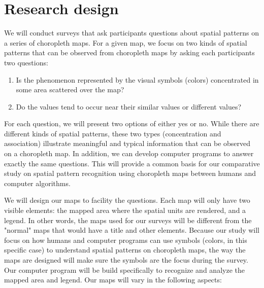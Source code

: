 \section{Research design}


We will conduct surveys that ask participants questions about spatial patterns on a series of choropleth maps. For a given map, we focus on two kinds of spatial patterns that can be observed from choropleth maps by asking each participants two questions:

\begin{enumerate}
    \item Is the phenomenon represented by the visual symbols (colors) concentrated in some area scattered over the map? 
    \item Do the values tend to occur near their similar values or different values? 
\end{enumerate}

For each question, we will present two options of either yes or no. While there are different kinds of spatial patterns, these two types (concentration and association) illustrate meaningful and typical information that can be observed on a choropleth map. In addition, we can develop computer programs to answer exactly the same questions. This will provide a common basis for our comparative study on spatial pattern recognition using choropleth maps between humans and computer algorithms.

We will design our maps to facility the questions. Each map will only have two visible elements: the mapped area where the spatial units are rendered, and a legend. In other words, the maps used for our surveys will be different from the "normal" maps that would have a title and other elements. Because our study will focus on how humans and computer programs can use symbols (colors, in this specific case) to understand spatial patterns on choropleth maps, the way the maps are designed will make sure the symbols are the focus during the survey. Our computer program will be build specifically to recognize and analyze the mapped area and legend. Our maps will vary in the following aspects:


